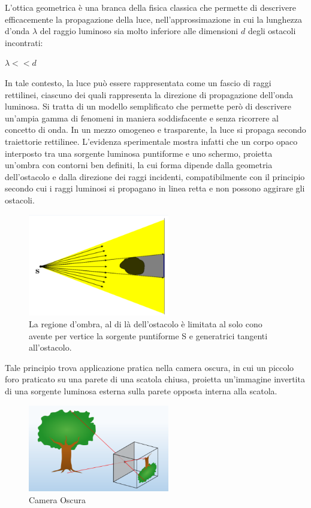 L'ottica geometrica è una branca della fisica classica che permette di descrivere 
efficacemente la propagazione della luce, nell'approssimazione in cui la lunghezza d'onda $\lambda$ del raggio luminoso 
sia molto inferiore alle dimensioni $d$ degli ostacoli incontrati: 
\begin{center}
	$\lambda << d$
\end{center}
In tale contesto, la luce può essere rappresentata come un fascio di raggi rettilinei, 
ciascuno dei quali rappresenta la direzione di propagazione dell'onda luminosa. Si tratta di un modello semplificato che 
permette però di descrivere un'ampia gamma di fenomeni in maniera soddisfacente e senza ricorrere al concetto di onda. In un mezzo omogeneo e trasparente, la luce si propaga secondo traiettorie rettilinee. 
L'evidenza sperimentale mostra infatti che  un corpo opaco interposto tra una sorgente luminosa puntiforme e uno schermo, 
proietta un'ombra con contorni ben definiti, la cui forma dipende dalla geometria dell'ostacolo e dalla direzione dei raggi incidenti, 
compatibilmente con il principio secondo cui i raggi luminosi si propagano in linea retta e non possono aggirare gli ostacoli.
\begin{figure}[H]
	\centering
	\includegraphics[width=0.55\textwidth]{./Latex/figures/pendolo.png}
	\caption{La regione d’ombra, al di là
		dell’ostacolo è limitata al solo
		cono avente per vertice la sorgente
		puntiforme S e generatrici tangenti
		all’ostacolo.}
\end{figure}

Tale principio trova applicazione pratica nella camera oscura, in cui un piccolo foro praticato su una parete di una scatola chiusa, proietta un'immagine invertita di una sorgente 
luminosa esterna sulla parete opposta interna alla scatola.
\begin{figure}[H]
	\centering
	\includegraphics[width=0.55\textwidth]{./Latex/figures/camera_oscura.png}
	\caption{Camera Oscura}
\end{figure}

